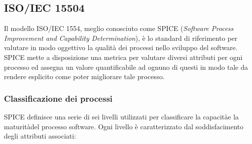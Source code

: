 \subsection{ISO/IEC 15504}
Il modello ISO/IEC 1554, meglio conosciuto come SPICE (\textit{Software Process Improvement and Capability Determination}), è lo standard di riferimento per valutare in modo oggettivo la qualità dei processi nello sviluppo del software. \\
SPICE mette a disposizione una metrica per valutare diversi attributi per ogni processo ed
assegna un valore quantificabile ad ognuno di questi in modo tale da rendere esplicito come poter migliorare tale processo.

\subsubsection{Classificazione dei processi}
SPICE definisce una serie di sei livelli utilizzati per classificare la capacità\glo e la maturità\glo del processo software. Ogni livello è caratterizzato dal soddisfacimento degli attributi associati:

